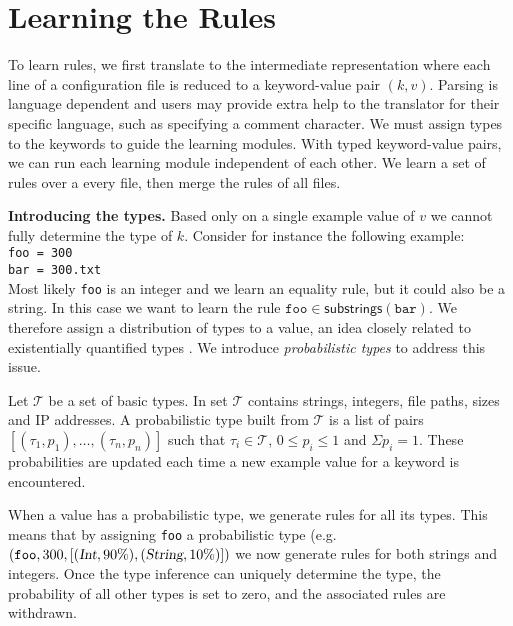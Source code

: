 \section{Learning the Rules}
\label{sec:system}

To learn rules, we first translate to the intermediate representation where each line of a configuration file is reduced to a keyword-value pair $(k,v)$.
Parsing is language dependent and users may provide extra help to the translator for their specific language, such as specifying a comment character.
We must assign types to the keywords to guide the learning modules. 
With typed keyword-value pairs, we can run each learning module independent of each other.
We learn a set of rules over a every file, then merge the rules of all files.

{\bf {Introducing the types.}} Based only on a single example value of $v$ we cannot fully determine the type of $k$.
Consider for instance the following example:\\
\texttt{\hspace*{2em}foo = 300\\
\hspace*{2em}bar = 300.txt}\\
Most likely \texttt{foo} is an integer and we learn an equality rule, but it could also be a string.
In this case we want to learn the rule $ \texttt{foo} \in \textsf{substrings}(\texttt{bar})$. 
We therefore assign a distribution of types to a value, an idea closely related to existentially quantified types \cite{Launchbury93lazyfunctional}. We introduce {\emph{probabilistic types}} to address this issue.

Let $\mathcal{T}$ be a set of basic types. In \app set $\mathcal{T}$ contains strings, integers, file paths, sizes and IP addresses. 
A probabilistic type built from $\mathcal{T}$ is a list of pairs $[(\tau_1, p_1),\ldots,(\tau_n, p_n)]$ such that $\tau_i \in \mathcal{T}$, 
$0 \le p_i \le 1$ 
and $\Sigma p_i = 1$. These probabilities are updated each time a new example value for a keyword is encountered.

When a value has a probabilistic type, we generate rules for all its types. This means that by assigning {\texttt{foo}} a probabilistic type 
(e.g. $(\texttt{foo}, 300, [(\textsl{Int},90\%),(\textsl{String},10\%)])$
we now generate rules for both strings and integers.
Once the type inference can uniquely determine the type, the probability of all other types is set to zero, and the associated rules are withdrawn.

